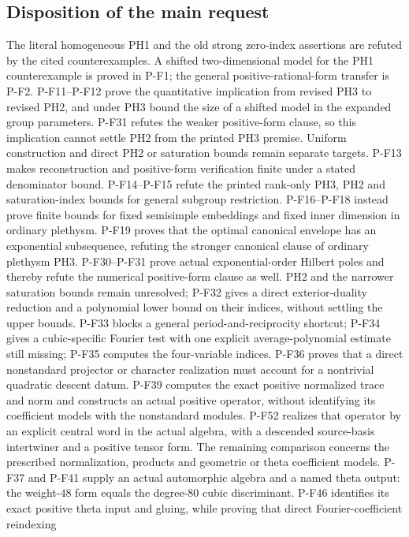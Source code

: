 \subsection{Disposition of the main request}
The literal homogeneous PH1 and the old strong zero-index assertions
are refuted by the cited counterexamples. A shifted two-dimensional
model for the PH1 counterexample is proved in P-F1; the general
positive-rational-form transfer is P-F2. P-F11--P-F12 prove the
quantitative implication from revised PH3 to revised PH2, and under
PH3 bound the size of a shifted model in the expanded group parameters.
P-F31 refutes the weaker positive-form clause, so this implication
cannot settle PH2 from the printed PH3 premise. Uniform construction
and direct PH2 or saturation bounds remain separate targets. P-F13 makes reconstruction and positive-form verification
finite under a stated denominator bound. P-F14--P-F15 refute the
printed rank-only PH3, PH2 and saturation-index bounds for general
subgroup restriction. P-F16--P-F18 instead prove finite bounds for
fixed semisimple embeddings and fixed inner dimension in ordinary
plethysm. P-F19 proves that the optimal canonical envelope has an
exponential subsequence, refuting the stronger canonical clause of
ordinary plethysm PH3. P-F30--P-F31 prove actual exponential-order
Hilbert poles and thereby refute the numerical positive-form clause
as well. PH2 and the narrower saturation bounds remain unresolved;
P-F32 gives a direct exterior-duality reduction and a polynomial
lower bound on their indices, without settling the upper bounds.
P-F33 blocks a general period-and-reciprocity shortcut; P-F34 gives
a cubic-specific Fourier test with one explicit average-polynomial
estimate still missing; P-F35 computes the four-variable indices.
P-F36 proves that a direct nonstandard projector or character
realization must account for a nontrivial quadratic descent datum.
P-F39 computes the exact positive normalized trace and norm and
constructs an actual positive operator, without identifying its
coefficient models with the nonstandard modules. P-F52 realizes
that operator by an explicit central word in the actual algebra,
with a descended source-basis intertwiner and a positive tensor
form. The remaining comparison concerns the prescribed
normalization, products and geometric or theta coefficient models.
P-F37 and P-F41
supply an actual automorphic algebra and a named theta output:
the weight-$48$ form equals the degree-$80$ cubic discriminant.
P-F46 identifies its exact positive theta input and gluing,
while proving that direct Fourier-coefficient reindexing

